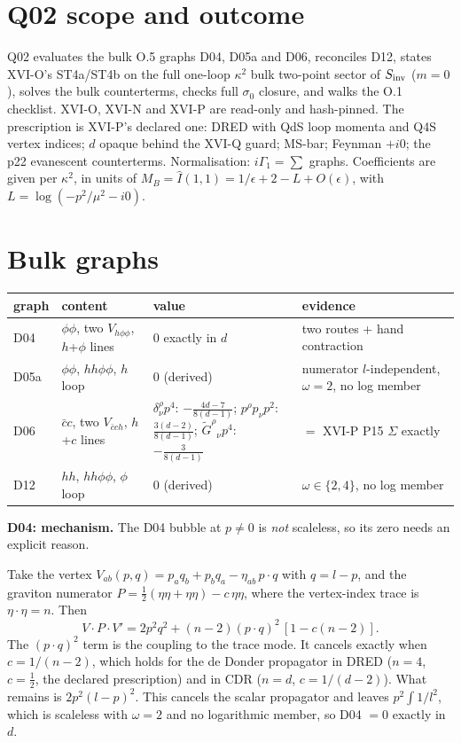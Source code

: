 \section{Q02 scope and outcome}
Q02 evaluates the bulk O.5 graphs D04, D05a and D06, reconciles D12, states XVI-O's ST4a/ST4b on the full one-loop
$\kappa^2$ bulk two-point sector of $S_{\rm inv}$ ($m=0$), solves the bulk counterterms, checks full $\sigma_0$ closure,
and walks the O.1 checklist. XVI-O, XVI-N and XVI-P are read-only and hash-pinned. The prescription is XVI-P's declared
one: DRED with QdS loop momenta and Q4S vertex indices; $d$ opaque behind the XVI-Q guard; MS-bar; Feynman $+i0$; the p22
evanescent counterterms.
Normalisation: $i\Gamma_1=\sum$ graphs. Coefficients are given per $\kappa^2$, in units of
$M_B=\hat I(1,1)=1/\epsilon+2-L+O(\epsilon)$, with $L=\log(-p^2/\mu^2-i0)$.

\section{Bulk graphs}
\begin{tabular}{llll}
graph & content & value & evidence\\\hline
D04 & $\phi\phi$, two $V_{h\phi\phi}$, $h$+$\phi$ lines & $0$ exactly in $d$ & two routes + hand contraction\\
D05a & $\phi\phi$, $hh\phi\phi$, $h$ loop & $0$ (derived) & numerator $l$-independent, $\omega=2$, no log member\\
D06 & $\bar c c$, two $V_{\bar c c h}$, $h$+$c$ lines & $\delta^\rho_\nu p^4$: $-\frac{4d-7}{8(d-1)}$;
 $p^\rho p_\nu p^2$: $\frac{3(d-2)}{8(d-1)}$; $\tilde G^\rho{}_\nu p^4$: $-\frac{3}{8(d-1)}$ & $=$ XVI-P P15 $\Sigma$ exactly\\
D12 & $hh$, $hh\phi\phi$, $\phi$ loop & $0$ (derived) & $\omega\in\{2,4\}$, no log member
\end{tabular}

\textbf{D04: mechanism.} The D04 bubble at $p\neq0$ is \emph{not} scaleless, so its zero needs an explicit reason.

Take the vertex $V_{ab}(p,q)=p_aq_b+p_bq_a-\eta_{ab}\,p\cdot q$ with $q=l-p$, and the graviton numerator
$P=\tfrac12(\eta\eta+\eta\eta)-c\,\eta\eta$, where the vertex-index trace is $\eta\cdot\eta=n$. Then
\[V\cdot P\cdot V'=2p^2q^2+(n-2)(p\cdot q)^2\,[1-c(n-2)].\]
The $(p\cdot q)^2$ term is the coupling to the trace mode. It cancels exactly when $c=1/(n-2)$, which holds for the de
Donder propagator in DRED ($n=4$, $c=\tfrac12$, the declared prescription) and in CDR ($n=d$, $c=1/(d-2)$). What remains
is $2p^2(l-p)^2$. This cancels the scalar propagator and leaves $p^2\!\int 1/l^2$, which is scaleless with $\omega=2$ and
no logarithmic member, so D04 $=0$ exactly in $d$.

